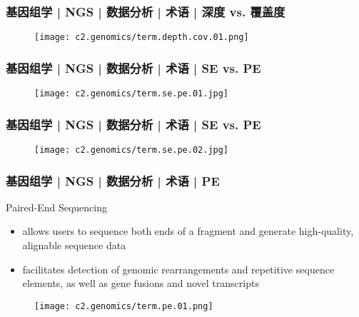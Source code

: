 \begin{frame}
  \frametitle{基因组学 | NGS | 数据分析 | 术语 | 深度 vs. 覆盖度}
  \begin{figure}
    \centering
    \texttt{[image: c2.genomics/term.depth.cov.01.png]}
  \end{figure}
\end{frame}

\begin{frame}
  \frametitle{基因组学 | NGS | 数据分析 | 术语 | SE vs. PE}
  \begin{figure}
    \centering
    \texttt{[image: c2.genomics/term.se.pe.01.jpg]}
  \end{figure}
\end{frame}

\begin{frame}
  \frametitle{基因组学 | NGS | 数据分析 | 术语 | SE vs. PE}
  \begin{figure}
    \centering
    \texttt{[image: c2.genomics/term.se.pe.02.jpg]}
  \end{figure}
\end{frame}

\begin{frame}
  \frametitle{基因组学 | NGS | 数据分析 | 术语 | PE}
  \begin{block}{Paired-End Sequencing}
    \begin{itemize}
      \item allows users to sequence both ends of a fragment and generate high-quality, alignable sequence data
      \item facilitates detection of genomic rearrangements and repetitive sequence elements, as well as gene fusions and novel transcripts
    \end{itemize}
  \end{block}
  \begin{figure}
    \centering
    \texttt{[image: c2.genomics/term.pe.01.png]}
  \end{figure}
\end{frame}

